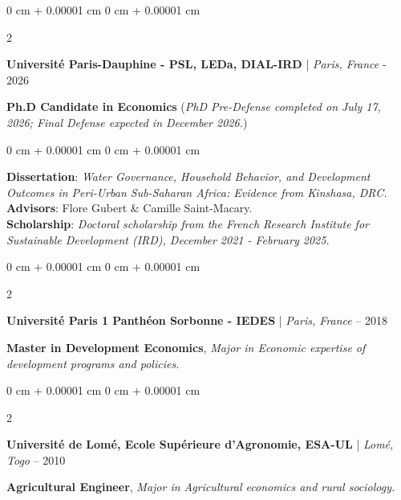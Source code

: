 \documentclass[10 pt, letterpaper]{article}
\newenvironment{onecolentry}{
    \begin{adjustwidth}{
        0 cm + 0.00001 cm
    }{
        0 cm + 0.00001 cm
    }
}{
    \end{adjustwidth}
} %
\newenvironment{twocolentry}[2][]{
    \onecolentry
    \def\secondColumn{#2}
    \setcolumnwidth{\fill, 4.5 cm}
    \begin{paracol}{2}
}{
    \switchcolumn \raggedleft \secondColumn
    \end{paracol}
    \endonecolentry
} %
\begin{document}
        \begin{twocolentry}{
        2021 - 2026
        }
        \textbf{Université Paris-Dauphine - PSL, LEDa, DIAL-IRD} | \textit{Paris, France} \end{twocolentry}
        \vspace{0.10 cm}
        \textbf{Ph.D Candidate in Economics} (\textit{PhD Pre-Defense completed on July 17, 2026; Final Defense expected in December 2026.})
            
        \begin{onecolentry}
            \textbf{Dissertation}: \textit{Water Governance, Household Behavior, and Development Outcomes in Peri-Urban Sub-Saharan Africa: Evidence from Kinshasa, DRC.} 
            \textbf{Advisors}: Flore Gubert \& Camille Saint-Macary. \\
            \textbf{Scholarship}: \textit{Doctoral scholarship from the French Research Institute for Sustainable Development (IRD), December 2021 - February 2025.}
        \end{onecolentry}
        \vspace{0.2 cm}
        
        \begin{twocolentry}{
        2016 – 2018
        }
        \textbf{Université Paris 1 Panthéon Sorbonne - IEDES} | \textit{Paris, France} \end{twocolentry}
        \vspace{0.10 cm}
        \textbf{Master in Development Economics}, \textit{Major in Economic expertise of development programs and policies.}

        \vspace{0.2 cm}
        
        \begin{twocolentry}{
        2004 – 2010
        }
        \textbf{Université de Lomé, Ecole Supérieure d'Agronomie, ESA-UL} | \textit{Lomé, Togo} \end{twocolentry}
        \vspace{0.10 cm}
        \textbf{Agricultural Engineer}, \textit{Major in Agricultural economics and rural sociology.}
        
\end{document}
